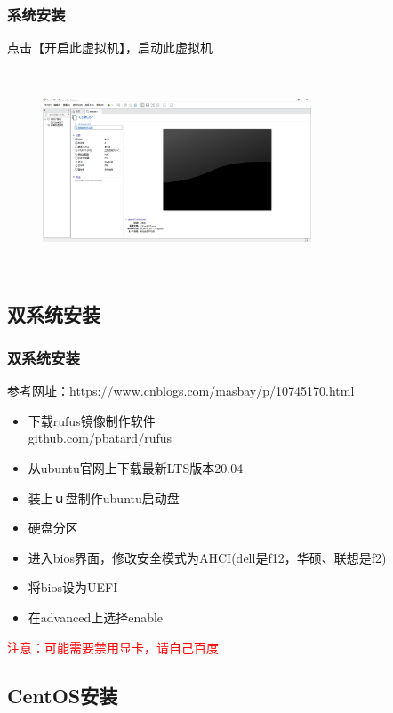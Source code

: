 \documentclass[notheorems,serif]{beamer}
\begin{document}
\begin{frame}
\frametitle{系统安装}
点击【开启此虚拟机】，启动此虚拟机
\begin{figure}
 \centering
 \includegraphics[width=8cm,height=6cm]{./figures/图片24.png}
\end{figure}
\end{frame}

\subsection{双系统安装}
\begin{frame}
\frametitle{双系统安装}
参考网址：https://www.cnblogs.com/masbay/p/10745170.html
    \begin{itemize}
    \item 下载rufus镜像制作软件 \\github.com/pbatard/rufus
	\item 从ubuntu官网上下载最新LTS版本20.04
	\item 装上ｕ盘制作ubuntu启动盘
	\item 硬盘分区
	\item 进入bios界面，修改安全模式为AHCI(dell是f12，华硕、联想是f2)
	\item 将bios设为UEFI
	\item 在advanced上选择enable
	\end{itemize}

\textcolor{red}{注意：可能需要禁用显卡，请自己百度}
	
\end{frame}


\subsection{CentOS安装}
\end{document}
